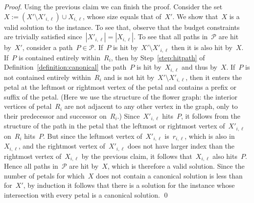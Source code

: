 \let\accentvec\vec  \documentclass{llncs}
\renewcommand{\P}{\ensuremath{\mathcal{P}}\xspace}
\begin{document}
\begin{proof}
Using the previous claim we can finish the proof. Consider the set~$X := (X' \setminus X'_{i,\ell}) \cup X_{i,\ell}$, whose size equals that of~$X'$. We show that~$X$ is a valid solution to the instance. To see that, observe that the budget constraints are trivially satisfied since~$|X'_{i,\ell}| = |X_{i,\ell}|$. To see that all paths in~$\P$ are hit by~$X'$, consider a path~$P \in \P$. If~$P$ is hit by~$X' \setminus X'_{i,\ell}$ then it is also hit by~$X$. If~$P$ is contained entirely within~$R_i$, then by Step~\ref{step:hitpath} of Definition~\ref{definition:canonical} the path~$P$ is hit by~$X_{i,\ell}$ and thus by~$X$. If~$P$ is not contained entirely within~$R_i$ and is not hit by~$X' \setminus X'_{i,\ell}$, then it enters the petal at the leftmost or rightmost vertex of the petal and contains a prefix or suffix of the petal. (Here we use the structure of the flower graph: the interior vertices of petal~$R_i$ are not adjacent to any other vertex in the graph, only to their predecessor and successor on~$R_i$.) Since~$X'_{i,\ell}$ hits~$P$, it follows from the structure of the path in the petal that the leftmost or rightmost vertex of~$X'_{i,\ell}$ on~$R_i$ hits~$P$. But since the leftmost vertex of~$X'_{i,\ell}$ is~$r_{i,\ell}$, which is also in~$X_{i,\ell}$, and the rightmost vertex of~$X'_{i,\ell}$ does not have larger index than the rightmost vertex of~$X_{i,\ell}$ by the previous claim, it follows that~$X_{i,\ell}$ also hits~$P$. Hence all paths in~$\P$ are hit by~$X$, which is therefore a valid solution. Since the number of petals for which~$X$ does not contain a canonical solution is less than for~$X'$, by induction it follows that there is a solution for the instance whose intersection with every petal is a canonical solution.
\qed
\end{proof}
\end{document}
